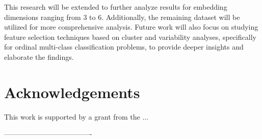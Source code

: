 \documentclass[a0,portrait]{a0poster}
\begin{document}
\begin{mdframed}[style=MyFrame]
\begin{multicols}{2}
This research will be extended to further analyze results for embedding dimensions ranging from 3 to 6. Additionally, the remaining dataset will be utilized for more comprehensive analysis. Future work will also focus on studying feature selection techniques based on cluster and variability analyses, specifically for ordinal multi-class classification problems, to provide deeper insights and elaborate the findings.

\section*{Acknowledgements}
%
This work is supported by a grant from the ...

%
%

-------------------------------------
\end{multicols}
\begin{center}
\end{center}
\end{mdframed}
\end{document}
